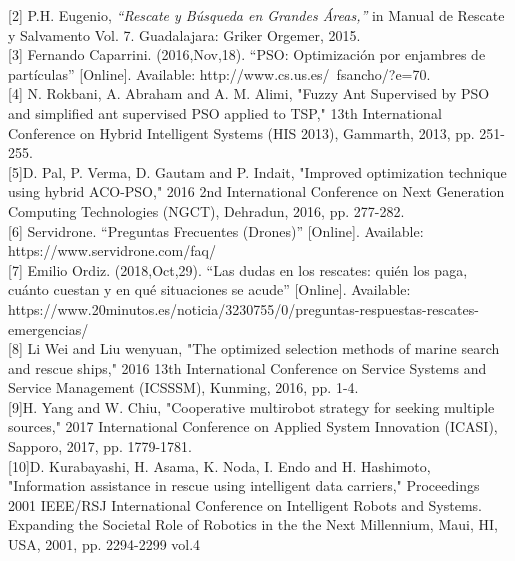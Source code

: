 \documentclass[journal]{IEEEtran}
\begin{document}
[2] P.H. Eugenio, \textit{``Rescate y Búsqueda en Grandes Áreas,''} in Manual de Rescate y Salvamento Vol. 7. Guadalajara: Griker Orgemer, 2015.\\

[3] Fernando Caparrini. (2016,Nov,18). ``PSO: Optimización por enjambres de partículas'' [Online]. Available: http://www.cs.us.es/~fsancho/?e=70.\\

[4] N. Rokbani, A. Abraham and A. M. Alimi, "Fuzzy Ant Supervised by PSO and simplified ant supervised PSO applied to TSP," 13th International Conference on Hybrid Intelligent Systems (HIS 2013), Gammarth, 2013, pp. 251-255.\\

[5]D. Pal, P. Verma, D. Gautam and P. Indait, "Improved optimization technique using hybrid ACO-PSO," 2016 2nd International Conference on Next Generation Computing Technologies (NGCT), Dehradun, 2016, pp. 277-282.\\


[6] Servidrone. ``Preguntas Frecuentes (Drones)'' [Online]. Available: https://www.servidrone.com/faq/\\

[7] Emilio Ordiz. (2018,Oct,29). ``Las dudas en los rescates: quién los paga, cuánto cuestan y en qué situaciones se acude'' [Online]. Available: https://www.20minutos.es/noticia/3230755/0/preguntas-respuestas-rescates-emergencias/\\

[8] Li Wei and Liu wenyuan, "The optimized selection methods of marine search and rescue ships," 2016 13th International Conference on Service Systems and Service Management (ICSSSM), Kunming, 2016, pp. 1-4.\\

[9]H. Yang and W. Chiu, "Cooperative multirobot strategy for seeking multiple sources," 2017 International Conference on Applied System Innovation (ICASI), Sapporo, 2017, pp. 1779-1781.\\

[10]D. Kurabayashi, H. Asama, K. Noda, I. Endo and H. Hashimoto, "Information assistance in rescue using intelligent data carriers," Proceedings 2001 IEEE/RSJ International Conference on Intelligent Robots and Systems. Expanding the Societal Role of Robotics in the the Next Millennium, Maui, HI, USA, 2001, pp. 2294-2299 vol.4
\end{document}

